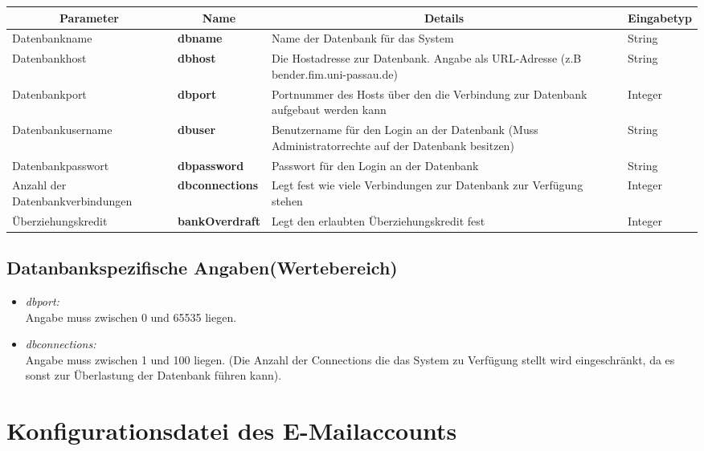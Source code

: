 \begin{center}
	\begin{longtable}{|p{4cm} | p{3cm}| p{7cm} | p{2cm} |}
		\hline
		\multicolumn{1}{|c|}{\textbf{Parameter}} & \multicolumn{1}{c|}{\textbf{Name}} & \multicolumn{1}{c|}{\textbf{Details}} & \multicolumn{1}{c|}{\textbf{Eingabetyp}}
		 \\ \hline
		Datenbankname & \textbf{dbname} & Name der Datenbank für das System & String \\ \hline
		Datenbankhost & \textbf{dbhost} & Die Hostadresse zur Datenbank. Angabe als URL-Adresse (z.B bender.fim.uni-passau.de)  & String \\ \hline
		Datenbankport & \textbf{dbport} & Portnummer des Hosts über den die Verbindung zur Datenbank aufgebaut werden kann & Integer \\ \hline
		Datenbankusername & \textbf{dbuser} & Benutzername für den Login an der Datenbank (Muss Administratorrechte auf der Datenbank besitzen) & String  \\ \hline
		Datenbankpasswort & \textbf{dbpassword} & Passwort für den Login an der Datenbank & String \\ \hline
		Anzahl der Datenbankverbindungen & \textbf{dbconnections} & Legt fest wie viele Verbindungen zur Datenbank zur Verfügung stehen & Integer \\ \hline
		Überziehungskredit & \textbf{bankOverdraft} & Legt den erlaubten Überziehungskredit fest & Integer \\ \hline
	\end{longtable}
	

\end{center}
\subsection{Datanbankspezifische Angaben(Wertebereich)}

\begin{itemize}
	\item \emph{dbport:}\\
		Angabe muss zwischen 0 und 65535 liegen.
	\item \emph{dbconnections:}\\
		Angabe muss zwischen 1 und 100 liegen. (Die Anzahl der Connections die das System zu Verfügung stellt wird eingeschränkt, da es sonst zur Überlastung der Datenbank führen kann).
\end{itemize}

\section{Konfigurationsdatei des E-Mailaccounts}
